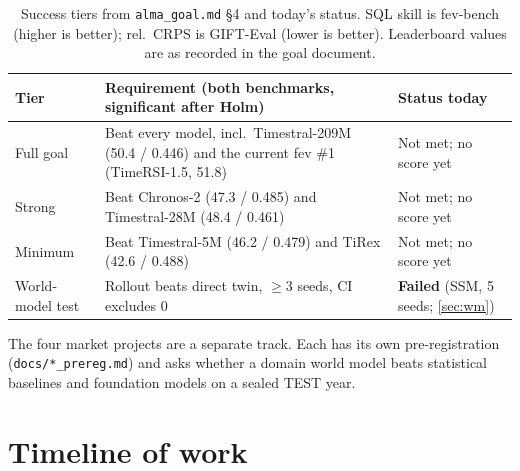 \documentclass[10pt,a4paper]{article}
\newcommand{\src}[1]{{\footnotesize\texttt{#1}}}
\begin{document}
\begin{table}[H]
\centering\small
\caption{Success tiers from \src{alma\_goal.md} \S4 and today's status. SQL skill is fev-bench (higher is better); rel.\ CRPS is GIFT-Eval (lower is better). Leaderboard values are as recorded in the goal document.}
\label{tab:tiers}
\begin{tabularx}{\linewidth}{@{}lXl@{}}
\toprule
Tier & Requirement (both benchmarks, significant after Holm) & Status today\\
\midrule
Full goal & Beat every model, incl.\ Timestral-209M (50.4 / 0.446) and the current fev \#1 (TimeRSI-1.5, 51.8) & Not met; no score yet\\
Strong & Beat Chronos-2 (47.3 / 0.485) and Timestral-28M (48.4 / 0.461) & Not met; no score yet\\
Minimum & Beat Timestral-5M (46.2 / 0.479) and TiRex (42.6 / 0.488) & Not met; no score yet\\
World-model test & Rollout beats direct twin, $\geq$3 seeds, CI excludes 0 & \textbf{Failed} (SSM, 5 seeds; \cref{sec:wm})\\
\bottomrule
\end{tabularx}
\end{table}

The four market projects are a separate track. Each has its own pre-registration (\src{docs/*\_prereg.md}) and asks whether a domain world model beats statistical baselines and foundation models on a sealed TEST year.

\section{Timeline of work}
\label{sec:timeline}
\end{document}
